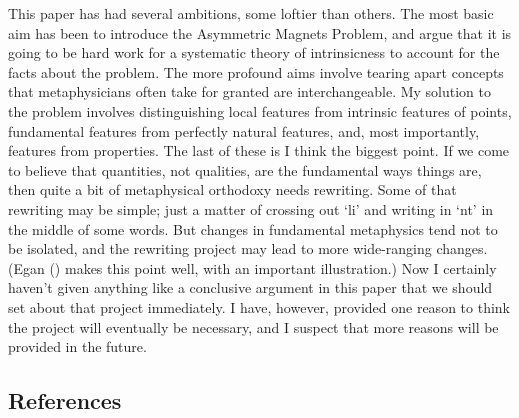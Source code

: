 \documentclass[
  11pt,
  letterpaper,
  DIV=11,
  numbers=noendperiod,
  twoside]{scrartcl}
\begin{document}
This paper has had several ambitions, some loftier than others. The most
basic aim has been to introduce the Asymmetric Magnets Problem, and
argue that it is going to be hard work for a systematic theory of
intrinsicness to account for the facts about the problem. The more
profound aims involve tearing apart concepts that metaphysicians often
take for granted are interchangeable. My solution to the problem
involves distinguishing local features from intrinsic features of
points, fundamental features from perfectly natural features, and, most
importantly, features from properties. The last of these is I think the
biggest point. If we come to believe that quantities, not qualities, are
the fundamental ways things are, then quite a bit of metaphysical
orthodoxy needs rewriting. Some of that rewriting may be simple; just a
matter of crossing out `li' and writing in `nt' in the middle of some
words. But changes in fundamental metaphysics tend not to be isolated,
and the rewriting project may lead to more wide-ranging changes. (Egan
() makes this point well, with an
important illustration.) Now I certainly haven't given anything like a
conclusive argument in this paper that we should set about that project
immediately. I have, however, provided one reason to think the project
will eventually be necessary, and I suspect that more reasons will be
provided in the future.

\subsection*{References}\label{references}
\end{document}
